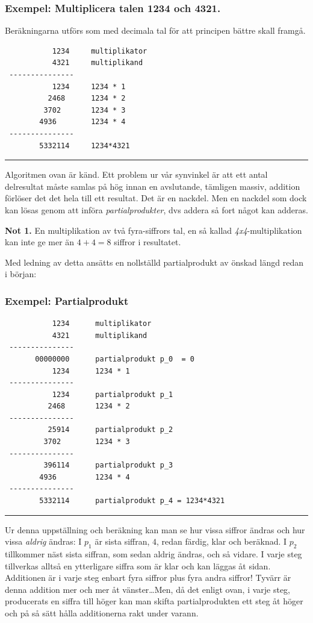\documentclass[oneside,10pt,a4paper,swedish]{scrbook}
\newcommand{\startex}[1]{\subsubsection{Exempel: #1}}
\newcommand{\slutex}{\vspace{-8mm}\begin{flushright} \rule{1ex}{1ex} \end{flushright}}
\begin{document}
\startex{Multiplicera talen 1234 och 4321.}

Beräkningarna utförs som med decimala tal för att principen bättre skall framgå.

\begin{center}
\begin{lstlisting}
           1234	    multiplikator
           4321     multiplikand
 ---------------
           1234     1234 * 1
          2468      1234 * 2
         3702       1234 * 3
        4936        1234 * 4
 ---------------
        5332114     1234*4321
\end{lstlisting}
\end{center}
\slutex

Algoritmen ovan är känd. Ett problem ur vår synvinkel är att ett antal delresultat måste samlas på hög innan en avslutande, tämligen massiv, addition förlöser det det hela till ett resultat. Det är en nackdel. Men en nackdel som dock kan lösas genom att införa \emph{partialprodukter}, dvs addera så fort något kan adderas. 

\textbf{Not 1.} En multiplikation av två fyra-siffrors tal, en så kallad \emph{4x4}-multiplikation kan inte ge mer än $4+4=8$ siffror i resultatet.

\newpage

Med ledning av detta ansätts en nollställd partialprodukt av önskad längd redan i början:

\subsubsection{Exempel: Partialprodukt}
\begin{center}
\begin{lstlisting}
           1234	     multiplikator
           4321      multiplikand
 ---------------
       00000000      partialprodukt p_0  = 0
           1234      1234 * 1
 ---------------
           1234      partialprodukt p_1       
          2468       1234 * 2
 ---------------
          25914      partialprodukt p_2
         3702        1234 * 3
 ---------------       
         396114      partialprodukt p_3
        4936         1234 * 4
 ---------------
        5332114      partialprodukt p_4 = 1234*4321
\end{lstlisting}
\end{center}
\slutex

Ur denna uppställning och beräkning kan man se hur vissa siffror ändras och hur vissa \emph{aldrig} ändras: I $p_1$ är sista siffran, $4$, redan färdig, klar och beräknad. I $p_2$ tillkommer näst sista siffran, som sedan aldrig ändras, och så vidare. I varje steg tillverkas alltså en ytterligare siffra som  är klar och kan läggas åt sidan. Additionen är i varje steg enbart fyra siffror plus fyra andra siffror! Tyvärr är denna addition mer och mer åt vänster\ldots Men, då det enligt ovan, i varje steg, producerats en siffra till höger kan man skifta partialprodukten ett steg åt höger och på så sätt hålla additionerna rakt under varann.
\end{document}
